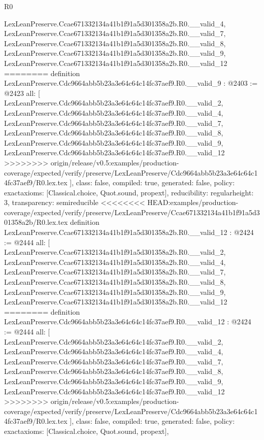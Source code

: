 \begin{lexlean}{R0}
\begin{coremodule}
{{{{{{{{{{{{{{{{{{{{{{{{{{{{{{{{{{{{{{{{{{{{{{{{    LexLeanPreserve.Ccae671332134a41b1f91a5d301358a2b.R0.__valid_4,
    LexLeanPreserve.Ccae671332134a41b1f91a5d301358a2b.R0.__valid_7,
    LexLeanPreserve.Ccae671332134a41b1f91a5d301358a2b.R0.__valid_8,
    LexLeanPreserve.Ccae671332134a41b1f91a5d301358a2b.R0.__valid_9,
    LexLeanPreserve.Ccae671332134a41b1f91a5d301358a2b.R0.__valid_12
========
definition LexLeanPreserve.Cdc9664abb5b23a3e64c64c14fc37aef9.R0.__valid_9 : @2403 := @2423 {
  all: [
    LexLeanPreserve.Cdc9664abb5b23a3e64c64c14fc37aef9.R0.__valid_2,
    LexLeanPreserve.Cdc9664abb5b23a3e64c64c14fc37aef9.R0.__valid_4,
    LexLeanPreserve.Cdc9664abb5b23a3e64c64c14fc37aef9.R0.__valid_7,
    LexLeanPreserve.Cdc9664abb5b23a3e64c64c14fc37aef9.R0.__valid_8,
    LexLeanPreserve.Cdc9664abb5b23a3e64c64c14fc37aef9.R0.__valid_9,
    LexLeanPreserve.Cdc9664abb5b23a3e64c64c14fc37aef9.R0.__valid_12
>>>>>>>> origin/release/v0.5:examples/production-coverage/expected/verify/preserve/LexLeanPreserve/Cdc9664abb5b23a3e64c64c14fc37aef9/R0.lex.tex
  ],
  class: false,
  compiled: true,
  generated: false,
  policy: exact{axioms: [Classical.choice, Quot.sound, propext]},
  reducibility: regular{height: 3},
  transparency: semireducible
}
<<<<<<<< HEAD:examples/production-coverage/expected/verify/preserve/LexLeanPreserve/Ccae671332134a41b1f91a5d301358a2b/R0.lex.tex
definition LexLeanPreserve.Ccae671332134a41b1f91a5d301358a2b.R0.__valid_12 : @2424 := @2444 {
  all: [
    LexLeanPreserve.Ccae671332134a41b1f91a5d301358a2b.R0.__valid_2,
    LexLeanPreserve.Ccae671332134a41b1f91a5d301358a2b.R0.__valid_4,
    LexLeanPreserve.Ccae671332134a41b1f91a5d301358a2b.R0.__valid_7,
    LexLeanPreserve.Ccae671332134a41b1f91a5d301358a2b.R0.__valid_8,
    LexLeanPreserve.Ccae671332134a41b1f91a5d301358a2b.R0.__valid_9,
    LexLeanPreserve.Ccae671332134a41b1f91a5d301358a2b.R0.__valid_12
========
definition LexLeanPreserve.Cdc9664abb5b23a3e64c64c14fc37aef9.R0.__valid_12 : @2424 := @2444 {
  all: [
    LexLeanPreserve.Cdc9664abb5b23a3e64c64c14fc37aef9.R0.__valid_2,
    LexLeanPreserve.Cdc9664abb5b23a3e64c64c14fc37aef9.R0.__valid_4,
    LexLeanPreserve.Cdc9664abb5b23a3e64c64c14fc37aef9.R0.__valid_7,
    LexLeanPreserve.Cdc9664abb5b23a3e64c64c14fc37aef9.R0.__valid_8,
    LexLeanPreserve.Cdc9664abb5b23a3e64c64c14fc37aef9.R0.__valid_9,
    LexLeanPreserve.Cdc9664abb5b23a3e64c64c14fc37aef9.R0.__valid_12
>>>>>>>> origin/release/v0.5:examples/production-coverage/expected/verify/preserve/LexLeanPreserve/Cdc9664abb5b23a3e64c64c14fc37aef9/R0.lex.tex
  ],
  class: false,
  compiled: true,
  generated: false,
  policy: exact{axioms: [Classical.choice, Quot.sound, propext]},
}}}}}}}}}}}}}}}}}}}}}}}}}}}}}}}}}}}}}}}}}}}}}}}}}}
\end{coremodule}
\end{lexlean}
